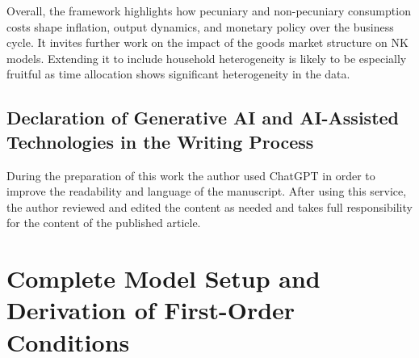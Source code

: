 \documentclass[12pt,3p,authoryear,review]{elsarticle}
\begin{document}
Overall, the framework highlights how pecuniary and non-pecuniary consumption costs shape inflation, output dynamics, and monetary policy over the business cycle. It invites further work on the impact of the goods market structure on NK models. Extending it to include household heterogeneity is likely to be especially fruitful as time allocation shows significant heterogeneity in the data.%
\newpage%
\begin{small}%
	\section*{Declaration of Generative AI and AI-Assisted Technologies in the Writing Process}%
	\noindent During the preparation of this work the author used ChatGPT in order to improve the readability and language of the manuscript. After using this service, the author reviewed and edited the content as needed and takes full responsibility for the content of the published article.%
\end{small}%
%
%
\newpage%
\appendix%
\section{Complete Model Setup and Derivation of First-Order Conditions}\label{sec:full_optimization}%
\end{document}

